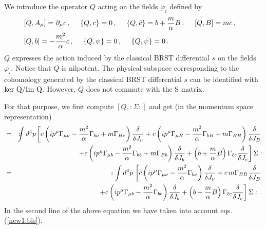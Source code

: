 \documentclass[a4paper,11pt]{article}
\def\G{\Gamma}
\begin{document}
We introduce the operator $Q$ \cite{CF} acting on the fields $\varphi_i$ 
defined by
%
\begin{eqnarray}
& [Q, A_\mu ] = \partial_\mu c \, , ~~~~
\{Q, c\} =0 \, , ~~~~ \{Q, \bar c\} = b + {m \over \alpha}B \, , ~~~~
[Q, B] = mc \, , & \nonumber \\
& [Q,b] = -{m^2 \over \alpha} c \, , ~~~~ \{ Q, \psi \} = 0 \, ,
 ~~~~ \{ Q,\bar\psi \}= 0 \, . &
\label{s3.9}
\end{eqnarray}
%
$Q$ expresses the action induced by the classical BRST differential $s$ on the fields $\varphi_i$.
Notice that $Q$ is nilpotent. The physical subspace corresponding to the cohomology generated by 
the classical BRST differential $s$
can be identified with ${\rm ker \ Q} / {\rm Im \ Q}$.
However, $Q$ does not commute with the
S matrix.
%

For that purpose, 
we first compute $[Q, :\Sigma:]$ and get (in the
momentum space representation)
%
\begin{eqnarray}
[Q, :\Sigma:]  & = &
:\!\!\!\!\int d^4p\left[ 
c \left ( i p^\mu \G_{\mu\nu} - {m^2 \over \alpha} \G_{b\nu}
+ m \G_{B\nu} \right ) {\delta \over \delta 
J_\nu} + c \left ( i p^\mu \G_{\mu B} - {m^2 \over \alpha} \G_{bB}
+ m \G_{BB} \right ) 
{\delta \over \delta J_B} \right . \nonumber \\
&& ~~~~~~~~~~ \left . 
+ c \left (i p^\mu \G_{\mu b} -{m^2 \over \alpha} \G_{bb} + m \G_{Bb}  \right )
{\delta \over \delta J_b} + \left ( b
+ {m \over \alpha} B \right )  \G_{\bar c c} {\delta \over \delta  J_c} 
\right ] \Sigma: \nonumber \\
& = & 
: \int d^4p \, \left [ 
c \left ( i p^\mu \G_{\mu\nu} - {m^2 \over \alpha} \G_{b\nu} \right ) 
{\delta \over \delta 
J_\nu} + c \, m \G_{BB} 
{\delta \over \delta J_B} \right . \nonumber \\
&& ~~~~~~~~~~ \left . 
+ c \left (i p^\mu \G_{\mu b} -{m^2 \over \alpha} \G_{bb}   \right )
{\delta \over \delta J_b} + \left ( b
+ {m \over \alpha} B \right )  \G_{\bar c c} {\delta \over \delta  J_c} 
\right ] \Sigma: \, .
\label{s3.10}
\end{eqnarray}
%
In the second line of the above equation we have taken into account
eqs.(\ref{new1.bis}).
\end{document}
